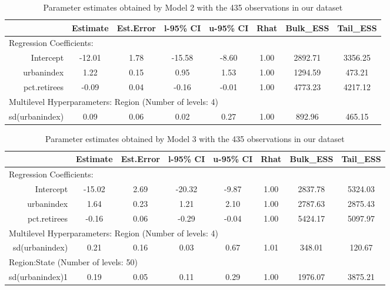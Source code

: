 \documentclass[12pt]{article}
\begin{document}
\begin{table}[ht]
	\centering
		 \begin{adjustbox}{max width=\textwidth}
	\begin{tabular}{rccccccc}
		\hline
		               & Estimate & Est.Error & l-95\% CI & u-95\% CI & Rhat & Bulk\_ESS & Tail\_ESS \\
		               \hline
 \multicolumn{8}{l}{Regression Coefficients:} \\
		     Intercept &   -12.01 &      1.78 &    -15.58 &     -8.60 & 1.00 &   2892.71 &   3356.25 \\
		    urbanindex &     1.22 &      0.15 &      0.95 &      1.53 & 1.00 &   1294.59 &    473.21 \\
		  pct.retirees &    -0.09 &      0.04 &     -0.16 &     -0.01 & 1.00 &   4773.23 &   4217.12 \\
		  \midrule
		  \multicolumn{8}{l}{Multilevel Hyperparameters: Region (Number of levels: 4)}                       \\
		sd(urbanindex) &     0.09 &      0.06 &      0.02 &      0.27 & 1.00 &    892.96 &    465.15 \\ \hline
	\end{tabular}
	\end{adjustbox}
	\caption{Parameter estimates obtained by Model 2 with the 435 observations in our dataset}
	\label{tab:model2}
\end{table}


\begin{table}[ht]
	\centering
	\begin{adjustbox}{max width=\textwidth}
	\begin{tabular}{rccccccc}
		\hline
		& Estimate & Est.Error & l-95\% CI & u-95\% CI & Rhat & Bulk\_ESS & Tail\_ESS \\ 
		\hline
		 \multicolumn{8}{l}{Regression Coefficients:} \\
		Intercept & -15.02 & 2.69 & -20.32 & -9.87 & 1.00 & 2837.78 & 5324.03 \\ 
		urbanindex & 1.64 & 0.23 & 1.21 & 2.10 & 1.00 & 2787.63 & 2875.43 \\ 
		pct.retirees & -0.16 & 0.06 & -0.29 & -0.04 & 1.00 & 5424.17 & 5097.97 \\
		\midrule
		\multicolumn{8}{l}{Multilevel Hyperparameters: Region (Number of levels: 4)} \\ 
		sd(urbanindex) & 0.21 & 0.16 & 0.03 & 0.67 & 1.01 & 348.01 & 120.67 \\ 
		\midrule
		\multicolumn{8}{l}{Region:State (Number of levels: 50)}  \\
		sd(urbanindex)1 & 0.19 & 0.05 & 0.11 & 0.29 & 1.00 & 1976.07 & 3875.21 \\ 
		\hline
	\end{tabular}
	\end{adjustbox}
	\caption{Parameter estimates obtained by Model 3 with the 435 observations in our dataset}
	\label{tab:model3}
\end{table}
\end{document}
